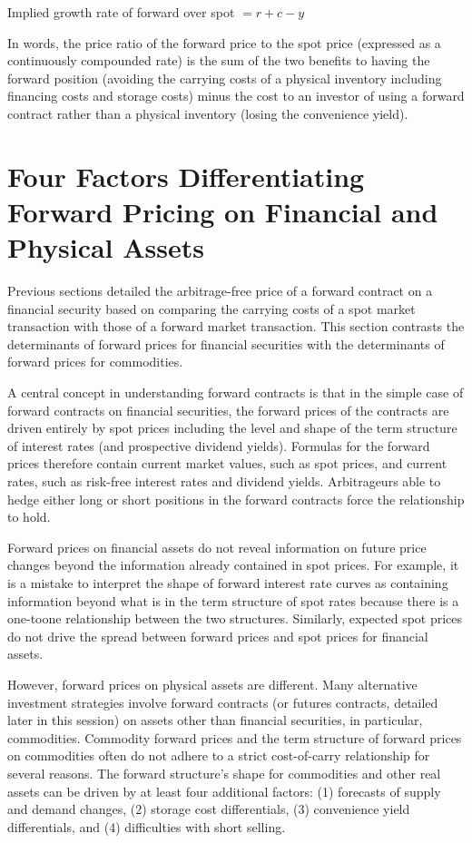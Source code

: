 \documentclass[11pt]{article}
\begin{document}
Implied growth rate of forward over spot $=r+c-y$

In words, the price ratio of the forward price to the spot price (expressed as a continuously compounded rate) is the sum of the two benefits to having the forward position (avoiding the carrying costs of a physical inventory including financing costs and storage costs) minus the cost to an investor of using a forward contract rather than a physical inventory (losing the convenience yield).

\section*{Four Factors Differentiating Forward Pricing on Financial and Physical Assets}
Previous sections detailed the arbitrage-free price of a forward contract on a financial security based on comparing the carrying costs of a spot market transaction with those of a forward market transaction. This section contrasts the determinants of forward prices for financial securities with the determinants of forward prices for commodities.

A central concept in understanding forward contracts is that in the simple case of forward contracts on financial securities, the forward prices of the contracts are driven entirely by spot prices including the level and shape of the term structure of interest rates (and prospective dividend yields). Formulas for the forward prices therefore contain current market values, such as spot prices, and current rates, such as risk-free interest rates and dividend yields. Arbitrageurs able to hedge either long or short positions in the forward contracts force the relationship to hold.

Forward prices on financial assets do not reveal information on future price changes beyond the information already contained in spot prices. For example, it is a mistake to interpret the shape of forward interest rate curves as containing information beyond what is in the term structure of spot rates because there is a one-toone relationship between the two structures. Similarly, expected spot prices do not drive the spread between forward prices and spot prices for financial assets.

However, forward prices on physical assets are different. Many alternative investment strategies involve forward contracts (or futures contracts, detailed later in this session) on assets other than financial securities, in particular, commodities. Commodity forward prices and the term structure of forward prices on commodities often do not adhere to a strict cost-of-carry relationship for several reasons. The forward structure's shape for commodities and other real assets can be driven by at least four additional factors: (1) forecasts of supply and demand changes, (2) storage cost differentials, (3) convenience yield differentials, and (4) difficulties with short selling.
\end{document}
